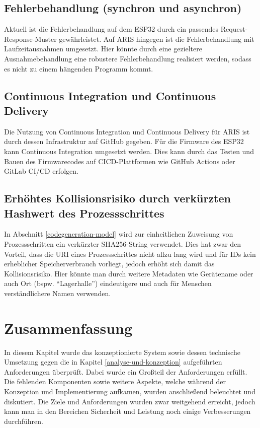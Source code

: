 \subsection{Fehlerbehandlung (synchron und asynchron)}

Aktuell ist die Fehlerbehandlung auf dem ESP32 durch ein passendes Request-Response-Muster gewährleistet. Auf ARIS hingegen ist die Fehlerbehandlung mit
Laufzeitausnahmen umgesetzt. Hier könnte durch eine gezieltere Ausnahmebehandlung eine robustere Fehlerbehandlung realisiert werden, sodass es nicht zu einem hängenden Programm kommt.

\subsection{Continuous Integration und Continuous Delivery}

Die Nutzung von Continuous Integration und Continuous Delivery für ARIS ist durch dessen Infrastruktur auf GitHub gegeben. Für die Firmware des ESP32 kann Continuous Integration
umgesetzt werden. Dies kann durch das Testen und Bauen des Firmwarecodes auf \ac{CICD}-Plattformen wie GitHub Actions oder GitLab CI/CD erfolgen.

\subsection{Erhöhtes Kollisionsrisiko durch verkürzten Hashwert des Prozessschrittes}

In Abschnitt \ref{codegeneration-model} wird zur einheitlichen Zuweisung von Prozessschritten ein verkürzter SHA256-String verwendet. Dies hat zwar den Vorteil, dass die URI eines Prozessschrittes nicht allzu lang wird und für IDs kein erheblicher Speicherverbrauch vorliegt, jedoch erhöht sich damit das Kollisionsrisiko. Hier könnte man durch weitere Metadaten wie Gerätename oder auch Ort (bspw. ``Lagerhalle'') eindeutigere und auch für Menschen verständlichere Namen verwenden.

\section{Zusammenfassung}

In diesem Kapitel wurde das konzeptionierte System sowie dessen technische Umsetzung gegen die in Kapitel \ref{analyse-und-konzeption} aufgeführten Anforderungen überprüft. Dabei
wurde ein Großteil der Anforderungen erfüllt. Die fehlenden Komponenten sowie weitere Aspekte, welche während der Konzeption und Implementierung aufkamen, wurden anschließend beleuchtet und
diskutiert. Die Ziele und Anforderungen wurden zwar weitgehend erreicht, jedoch kann man in den Bereichen Sicherheit und Leistung noch einige Verbesserungen durchführen.
